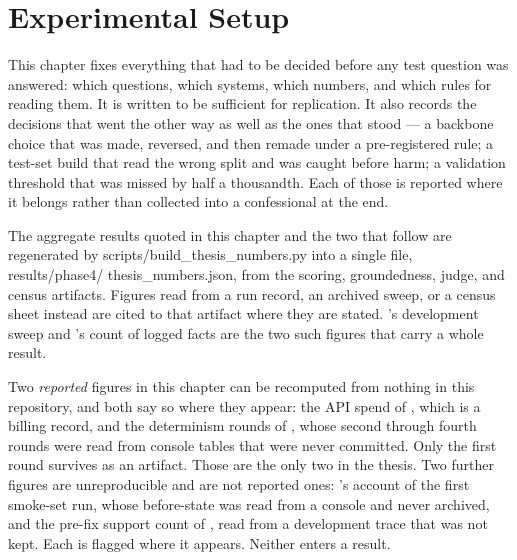 \chapter{Experimental Setup}\label{ch:setup}

This chapter fixes everything that had to be decided before any test question
was answered: which questions, which systems, which numbers, and which rules for
reading them. It is written to be sufficient for replication. It also records
the decisions that went the other way as well as the ones that stood --- a
backbone choice that was made, reversed, and then remade under a pre-registered
rule; a test-set build that read the wrong split and was caught before harm; a
validation threshold that was missed by half a thousandth. Each of those is
reported where it belongs rather than collected into a confessional at the end.

The aggregate results quoted in this chapter and the two that follow are
regenerated by \textsf{scripts/\allowbreak build\_thesis\_numbers.py} into a
single file, \textsf{results/\allowbreak phase4/\allowbreak
thesis\_numbers.json}, from the scoring, groundedness, judge, and census
artifacts. Figures read from a run record, an archived sweep, or a census sheet
instead are cited to that artifact where they are stated.
's development sweep and 's
count of logged facts are the two such figures that carry a whole result.

Two \emph{reported} figures in this chapter can be recomputed from nothing in
this repository, and both say so where they appear: the API spend of
, which is a billing record, and the determinism rounds of
, whose second through fourth rounds were read from console
tables that were never committed. Only the first round survives as an
artifact. Those are the only two in the thesis. Two further figures are
unreproducible and are not reported ones: 's account
of the first smoke-set run, whose before-state was read from a console and never
archived, and the pre-fix support count of , read from
a development trace that was not kept. Each is flagged where it appears. Neither
enters a result.

